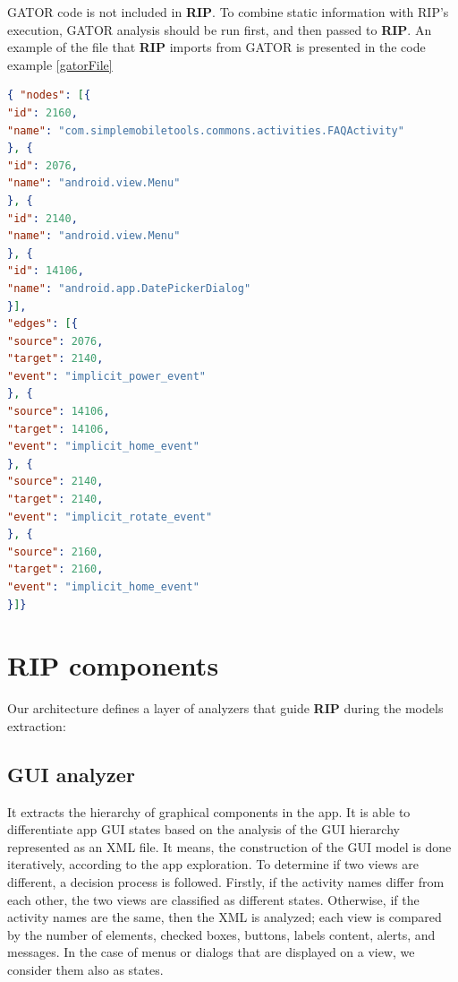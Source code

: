 GATOR code is not included in \textbf{RIP}. To combine static information with RIP's execution, GATOR analysis should be run first, and then passed to \textbf{RIP}. An example of the file that \textbf{RIP} imports from GATOR is presented in the code example \ref{gatorFile}

\begin{lstlisting}[language=json, caption={Fragment of a GATOR file obtained from a native application}, label={gatorFile}, firstnumber=1]
{ "nodes": [{
"id": 2160,
"name": "com.simplemobiletools.commons.activities.FAQActivity"
}, {
"id": 2076,
"name": "android.view.Menu"
}, {
"id": 2140,
"name": "android.view.Menu"
}, {
"id": 14106,
"name": "android.app.DatePickerDialog"
}],
"edges": [{
"source": 2076,
"target": 2140,
"event": "implicit_power_event"
}, {
"source": 14106,
"target": 14106,
"event": "implicit_home_event"
}, {
"source": 2140,
"target": 2140,
"event": "implicit_rotate_event"
}, {
"source": 2160,
"target": 2160,
"event": "implicit_home_event"
}]}
\end{lstlisting}

\section{RIP components}		

Our architecture defines a layer of analyzers that guide \textbf{RIP} during the models extraction:

\subsection{GUI analyzer}

It extracts the hierarchy of graphical components in the app. It is able to differentiate app GUI states based on the analysis of the GUI hierarchy represented as an XML file. It means, the construction of the GUI model is done iteratively, according to the app exploration. To determine if two views are different, a decision process is followed. Firstly, if the activity names differ from each other, the two views are classified as different states. Otherwise, if the activity names are the same, then the XML is analyzed; each view is compared by the number of elements, checked boxes,  buttons, labels content, alerts, and messages.  In the case of menus or dialogs that are displayed on a view, we consider them also as states.

